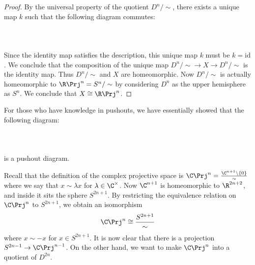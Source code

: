\documentclass[a4paper]{article}
\begin{document}
\begin{prp}{}{}
\begin{proof}
By the universal property of the quotient $D^n/\sim$, there exists a unique map $k$ such that the following diagram commutes: \\~\\
\\~\\
Since the identity map satisfies the description, this unique map $k$ must be $k=\text{id}$. We conclude that the composition of the unique map $D^n/\sim\to X\to D^n/\sim$ is the identity map. Thus $D^n/\sim$ and $X$ are homeomorphic. Now $D^n/\sim$ is actually homeomorphic to $\R\Prj^n=S^n/\sim$ by considering $D^n$ as the upper hemisphere as $S^n$. We conclude that $X\cong\R\Prj^n$. 
\end{proof}
\end{prp}

For those who have knowledge in pushouts, we have essentially showed that the following diagram: \\~\\
\\~\\
is a pushout diagram. 

Recall that the definition of the complex projective space is $\C\Prj^n=\frac{\C^{n+1}\setminus\{0\}}{\sim}$ where we say that $x\sim\lambda x$ for $\lambda\in\C^\times$. Now $\C^{n+1}$ is homeomorphic to $\R^{2n+2}$, and inside it sits the sphere $S^{2n+1}$. By restricting the equivalence relation on $\C\Prj^n$ to $S^{2n+1}$, we obtain an isomorphism $$\C\Prj^n\cong\frac{S^{2n+1}}{\sim}$$ where $x\sim -x$ for $x\in S^{2n+1}$. It is now clear that there is a projection $S^{2n-1}\to\C\Prj^{n-1}$. On the other hand, we want to make $\C\Prj^n$ into a quotient of $D^{2n}$. 
\end{document}
